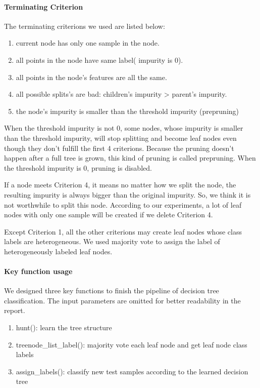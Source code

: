 \documentclass[paper=letter, fontsize=11pt]{article}
\numberwithin{equation}{section}		%
\numberwithin{figure}{section}			%
\numberwithin{table}{section}				%
\begin{document}
\paragraph{Terminating Criterion} The terminating criterions we used are listed below:
\begin{enumerate}
  \item current node has only one sample in the node.
  \item all points in the node have same label( impurity is 0).
  \item all points in the node's features are all the same.
  \item all possible splits's are bad: children's impurity > parent's impurity.
  \item the node's impurity is smaller than the threshold impurity (prepruning)
\end{enumerate}

When the threshold impurity is not 0, some nodes, whose impurity is smaller
than the threshold impurity, will stop splitting and become leaf nodes even though
they don't fulfill the first 4 criterions. Because the pruning doesn't happen after a full
tree is grown, this kind of pruning is called prepruning. When the threshold impurity
is 0, pruning is disabled.

If a node meets Criterion 4, it means no matter how we split the node, the resulting
impurity is always bigger than the original impurity. So, we think it is not
worthwhile to split this node. According to our experiments, a lot of leaf nodes with
only one sample will be created if we delete Criterion 4.

Except Criterion 1, all the other criterions may create leaf nodes whose class labels
are heterogeneous. We used majority vote to assign the label of heterogeneously
labeled leaf nodes.

\paragraph{Key function usage}  We designed three key functions to finish the pipeline of
decision tree classification. The input parameters are omitted for better readability
in the report.
\begin{enumerate}
  \item hunt(): learn the tree structure
  \item treenode{\_}list{\_}label(): majority vote each leaf node and get leaf node class labels
  \item assign{\_}labels(): classify new test samples according to the learned decision
tree
\end{enumerate}
\end{document}

